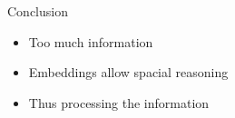 \documentclass[12pt,landscape,english]{beamer}
\begin{document}
\begin{frame}{Conclusion}
	\begin{itemize}
		\item Too much information
		\item Embeddings allow spacial reasoning
		\item Thus processing the information
	\end{itemize}
		\centering{}
\end{frame}
\end{document}
